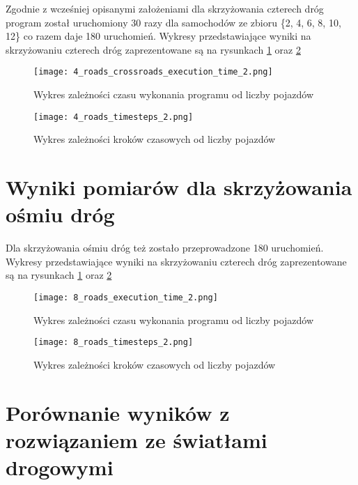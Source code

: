 Zgodnie z wcześniej opisanymi założeniami dla skrzyżowania czterech dróg program został uruchomiony 30 razy dla samochodów ze zbioru \{2, 4, 6, 8, 10, 12\} co razem daje 180 uruchomień.
\newline
\newline
Wykresy przedstawiające wyniki na skrzyżowaniu czterech dróg zaprezentowane są na rysunkach \ref{four-roads-crossroads-execution-time} oraz \ref{four-roads-crossroads-timesteps}
\begin{figure}[ht]
  \texttt{[image: 4\_roads\_crossroads\_execution\_time\_2.png]}
  \caption{Wykres zależności czasu wykonania programu od liczby pojazdów}
  \label{four-roads-crossroads-execution-time}
\end{figure}
\begin{figure}[ht]
  \texttt{[image: 4\_roads\_timesteps\_2.png]}
  \caption{Wykres zależności kroków czasowych od liczby pojazdów}
  \label{four-roads-crossroads-timesteps}
\end{figure}

\section{Wyniki pomiarów dla skrzyżowania ośmiu dróg}

Dla skrzyżowania ośmiu dróg też zostało przeprowadzone 180 uruchomień.
\newline
\newline
Wykresy przedstawiające wyniki na skrzyżowaniu czterech dróg zaprezentowane są na rysunkach \ref{four-roads-crossroads-execution-time} oraz \ref{four-roads-crossroads-timesteps}
\begin{figure}[H]
    \texttt{[image: 8\_roads\_execution\_time\_2.png]}
  \caption{Wykres zależności czasu wykonania programu od liczby pojazdów}
  \label{eight-roads-crossroads-execution-time}
\end{figure}
\begin{figure}[H]
    \texttt{[image: 8\_roads\_timesteps\_2.png]}
  \caption{Wykres zależności kroków czasowych od liczby pojazdów}
  \label{eight-roads-crossroads-timesteps}
\end{figure}

\section{Porównanie wyników z rozwiązaniem ze światłami drogowymi}

